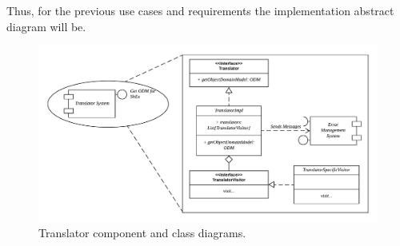 Thus, for the previous use cases and requirements the implementation abstract diagram will be.

\begin{figure}[h!]
    \includegraphics[width=\textwidth]{images/trans-diagram.pdf}
    \centering
    \caption[Translator component and class diagrams]{Translator component and class diagrams.}
    \label{fig:trans-diag}
\end{figure}